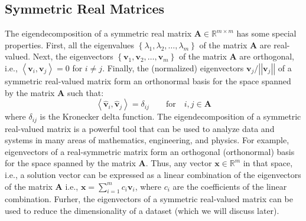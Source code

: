 \documentclass{article}[11pt]
\newcommand{\norm}[1]{\left|\left|#1\right|\right|}
\begin{document}
\subsection{Symmetric Real Matrices}
The eigendecomposition of a symmetric real matrix $\mathbf{A}\in\mathbb{R}^{m\times{m}}$ has some special properties. 
First, all the eigenvalues $\left\{\lambda_{1},\lambda_{2},\dots,\lambda_{m}\right\}$ of the matrix $\mathbf{A}$ are real-valued.
Next, the eigenvectors $\left\{\mathbf{v}_{1},\mathbf{v}_{2},\dots,\mathbf{v}_{m}\right\}$ of the matrix $\mathbf{A}$ are orthogonal, i.e., $\left<\mathbf{v}_{i},\mathbf{v}_{j}\right> = 0$ for $i\neq{j}$.
Finally, the (normalized) eigenvectors $\mathbf{v}_{j}/\norm{\mathbf{v}_{j}}$ of a symmetric real-valued matrix 
form an orthonormal basis for the space spanned by the matrix $\mathbf{A}$ such that:
\begin{equation}
\left<\hat{\mathbf{v}}_{i},\hat{\mathbf{v}}_{j}\right> = \delta_{ij}\qquad\text{for}\quad{i,j\in\mathbf{A}}
\end{equation}
where $\delta_{ij}$ is the Kronecker delta function. The eigendecomposition of a symmetric real-valued matrix is a powerful tool that can be used to analyze data and systems in many areas of mathematics, engineering, and physics.
For example, eigenvectors of a real-symmetric matrix form an orthogonal (orthonormal) basis for the space spanned by the matrix $\mathbf{A}$.
Thus, any vector $\mathbf{x}\in\mathbb{R}^{m}$  in that space, i.e., a solution vector can be expressed as a linear combination of the eigenvectors of the matrix $\mathbf{A}$
i.e., $\mathbf{x} = \sum_{i=1}^{m}c_{i}\mathbf{v}_{i}$, where $c_{i}$ are the coefficients of the linear combination.
Furher, the eigenvectors of a symmetric real-valued matrix can be used to reduce the dimensionality of a dataset (which we will discuss later).
\end{document}

